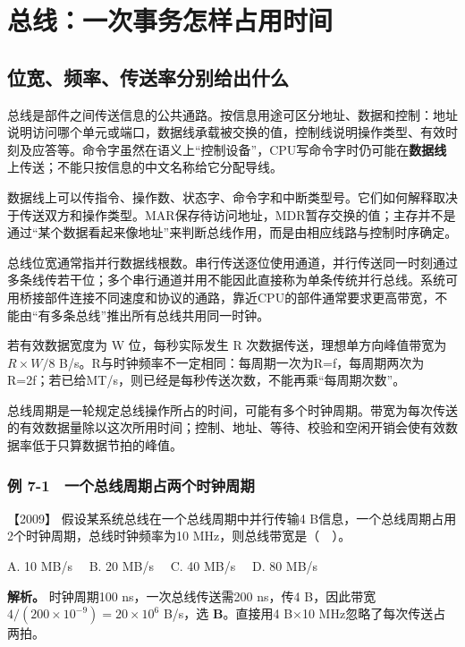 \section{总线：一次事务怎样占用时间}\label{co-ch7}

\subsection{位宽、频率、传送率分别给出什么}\label{co-07-01}

总线是部件之间传送信息的公共通路。按信息用途可区分地址、数据和控制：地址说明访问哪个单元或端口，数据线承载被交换的值，控制线说明操作类型、有效时刻及应答等。命令字虽然在语义上``控制设备''，CPU写命令字时仍可能在\textbf{数据线}上传送；不能只按信息的中文名称给它分配导线。

数据线上可以传指令、操作数、状态字、命令字和中断类型号。它们如何解释取决于传送双方和操作类型。MAR保存待访问地址，MDR暂存交换的值；主存并不是通过``某个数据看起来像地址''来判断总线作用，而是由相应线路与控制时序确定。

总线位宽通常指并行数据线根数。串行传送逐位使用通道，并行传送同一时刻通过多条线传若干位；多个串行通道并用不能因此直接称为单条传统并行总线。系统可用桥接部件连接不同速度和协议的通路，靠近CPU的部件通常要求更高带宽，不能由``有多条总线''推出所有总线共用同一时钟。

若有效数据宽度为 W 位，每秒实际发生 R 次数据传送，理想单方向峰值带宽为 \(R\times W/8\) B/s。R与时钟频率不一定相同：每周期一次为R=f，每周期两次为R=2f；若已给MT/s，则已经是每秒传送次数，不能再乘``每周期次数''。

总线周期是一轮规定总线操作所占的时间，可能有多个时钟周期。带宽为每次传送的有效数据量除以这次所用时间；控制、地址、等待、校验和空闲开销会使有效数据率低于只算数据节拍的峰值。

\subsubsection{例 7-1　一个总线周期占两个时钟周期}\label{co-ex7-1}

\noindent{}【2009】 假设某系统总线在一个总线周期中并行传输4 B信息，一个总线周期占用2个时钟周期，总线时钟频率为10 MHz，则总线带宽是（　）。

A. 10 MB/s　 B. 20 MB/s　 C. 40 MB/s　 D. 80 MB/s


\textbf{解析。} 时钟周期100 ns，一次总线传送需200 ns，传4 B，因此带宽 \(4/(200\times10^{-9})=20\times10^6\) B/s，选 \textbf{B}。直接用4 B×10 MHz忽略了每次传送占两拍。

